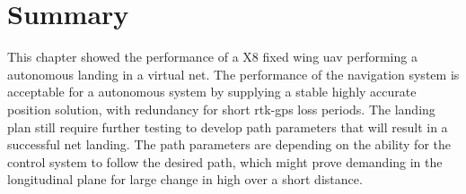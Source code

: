 \section{Summary}
This chapter showed the performance of a X8 fixed wing \gls{uav} performing a autonomous landing in a virtual net. The performance of the navigation system is acceptable for a autonomous system by supplying a stable highly accurate position solution, with redundancy for short \gls{rtk-gps} loss periods. The landing plan still require further testing to develop path parameters that  will result in a successful net landing. The path parameters are depending on the ability for the control system to follow the desired path, which might prove demanding in the longitudinal plane for large change in high over a short distance.